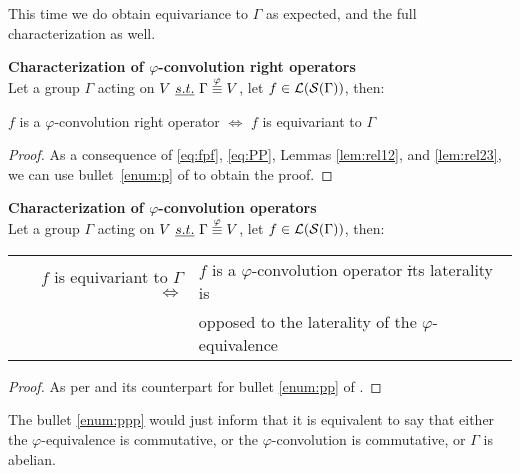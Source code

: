This time we do obtain equivariance to $\Gamma$ as expected, and the full characterization as well.

\begin{theorem}\textbf{Characterization of $\varphi$-convolution right operators}\\
Let a group $\Gamma$ acting on $V~\emph{s.t.}~ \Gamma \overset{\varphi}{\equiv} V$, let $f \in \mathcal{L}(\mathcal{S}(\Gamma))$, then:\\
\centerline{$f$ is a $\varphi$-convolution right operator $\Leftrightarrow$ $f$ is equivariant to $\Gamma$}
\label{prop:equiG}
\end{theorem}
\begin{proof}
As a consequence of \eqref{eq:fpf}, \eqref{eq:PP}, Lemmas \ref{lem:rel12}, and \ref{lem:rel23}, we can use bullet~\ref{enum:p} of  to obtain the proof.
\end{proof}

\begin{corollary}\textbf{Characterization of $\varphi$-convolution operators}\\
Let a group $\Gamma$ acting on $V~\emph{s.t.}~ \Gamma \overset{\varphi}{\equiv} V$, let $f \in \mathcal{L}(\mathcal{S}(\Gamma))$, then:\\
\begin{tabular}{rl}
  $f$ is equivariant to $\Gamma$ $\Leftrightarrow$ &
  $f$ is a $\varphi$-convolution operator \st its laterality is \\
  & opposed to the laterality of the $\varphi$-equivalence
\end{tabular}
\label{cor:equiG}
\end{corollary}
\begin{proof}
As per  and its counterpart for bullet \ref{enum:pp} of .
\end{proof}

\begin{remark}
The bullet \ref{enum:ppp} would just inform that it is equivalent to say that either the $\varphi$-equivalence is commutative, or the $\varphi$-convolution is commutative, or $\Gamma$ is abelian.
\end{remark}


